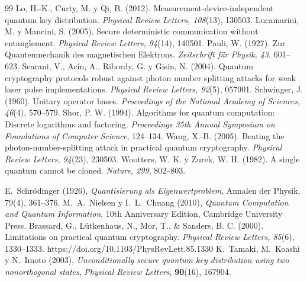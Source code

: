 \begin{thebibliography}{99}
 Lo, H.-K., Curty, M. y Qi, B. (2012). Measurement-device-independent quantum key distribution. \emph{Physical Review Letters, 108}(13), 130503.
 Lucamarini, M. y Mancini, S. (2005). Secure deterministic communication without entanglement. \emph{Physical Review Letters, 94}(14), 140501.
 Pauli, W. (1927). Zur Quantenmechanik des magnetischen Elektrons. \emph{Zeitschrift f\"ur Physik, 43}, 601--623.
 Scarani, V., Acín, A., Ribordy, G. y Gisin, N. (2004). Quantum cryptography protocols robust against photon number splitting attacks for weak laser pulse implementations. \emph{Physical Review Letters, 92}(5), 057901.
 Schwinger, J. (1960). Unitary operator bases. \emph{Proceedings of the National Academy of Sciences, 46}(4), 570--579.
 Shor, P. W. (1994). Algorithms for quantum computation: Discrete logarithms and factoring. \emph{Proceedings 35th Annual Symposium on Foundations of Computer Science}, 124--134.
 Wang, X.-B. (2005). Beating the photon-number-splitting attack in practical quantum cryptography. \emph{Physical Review Letters, 94}(23), 230503.
 Wootters, W. K. y Zurek, W. H. (1982). A single quantum cannot be cloned. \emph{Nature, 299}, 802--803.

 E.~Schrödinger (1926),
\textit{Quantisierung als Eigenwertproblem}, Annalen der Physik, 79(4), 361--376.
 M.~A.~Nielsen y I.~L.~Chuang (2010), \textit{Quantum Computation and Quantum Information}, 10th Anniversary Edition, Cambridge University Press.
Brassard, G., Lütkenhaus, N., Mor, T., \& Sanders, B. C. (2000). Limitations on practical quantum cryptography. \emph{Physical Review Letters, 85}(6), 1330--1333. https://doi.org/10.1103/PhysRevLett.85.1330
 K.~Tamaki, M.~Koashi y N.~Imoto (2003), \textit{Unconditionally secure quantum key distribution using two nonorthogonal states}, \textit{Physical Review Letters}, \textbf{90}(16), 167904.
\end{thebibliography}

